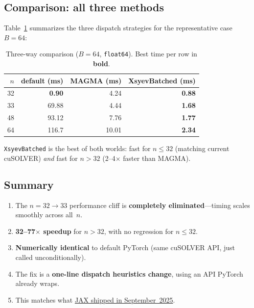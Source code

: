 \documentclass[10pt, letterpaper]{article}
\begin{document}
\subsection{Comparison: all three methods}

Table~\ref{tab:comparison} summarizes the three dispatch strategies for
the representative case $B = 64$:

\begin{table}[h]
\centering
\caption{Three-way comparison ($B = 64$, \texttt{float64}).
         Best time per row in \textbf{bold}.}
\label{tab:comparison}
\begin{tabular}{r rrr}
\toprule
$n$ & default (ms) & MAGMA (ms) & XsyevBatched (ms) \\
\midrule
 32 & \textbf{0.90}  & 4.24  & \textbf{0.88} \\
 33 & 69.88 & 4.44  & \textbf{1.68} \\
 48 & 93.12 & 7.76  & \textbf{1.77} \\
 64 & 116.7 & 10.01 & \textbf{2.34} \\
\bottomrule
\end{tabular}
\end{table}

\texttt{XsyevBatched} is the best of both worlds: fast for $n \le 32$
(matching current cuSOLVER) \emph{and} fast for $n > 32$
(2--4$\times$ faster than MAGMA).

\subsection{Summary}

\begin{enumerate}
    \item The $n = 32 \to 33$ performance cliff is \textbf{completely
    eliminated}---timing scales smoothly across all~$n$.
    \item \textbf{32--77$\times$ speedup} for $n > 32$, with no
    regression for $n \le 32$.
    \item \textbf{Numerically identical} to default PyTorch (same cuSOLVER
    API, just called unconditionally).
    \item The fix is a \textbf{one-line dispatch heuristics change}, using an API PyTorch already wraps.
    \item This matches what
    \href{https://github.com/jax-ml/jax/pull/31375}{JAX shipped in
    September~2025}.
\end{enumerate}


\appendix
\end{document}
